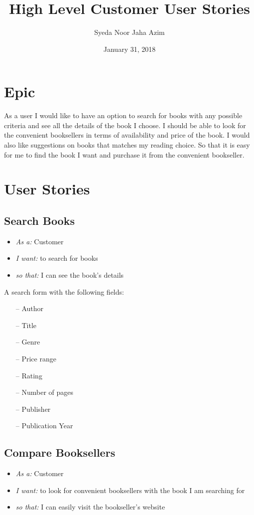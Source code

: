\documentclass{article}
\title{High Level Customer User Stories}
\author{Syeda Noor Jaha Azim}
\date{January 31, 2018}
\begin{document}
\maketitle

\section{Epic }
As a user I would like to have an option to search for books with any possible criteria and see all the details of the book I choose. I should be able to look for the convenient booksellers in terms of availability and price of the book. I would also like suggestions on books that matches my reading choice. So that it is easy for me to find the book I want and purchase it from the convenient bookseller. 

\section{User Stories }
\subsection{Search Books}
\begin{itemize}
\item \emph{As a:} Customer
\item \emph{I want:} to search for books
\item \emph{so that:}  I can see the book’s details
\end{itemize}


 A search form with the following fields:
\begin{itemize}
	\item[--] Author
	\item[--] Title
	\item[--] Genre
	\item[--] Price range
	\item[--] Rating
	\item[--] Number of pages
	\item[--] Publisher
	\item[--] Publication Year
\end{itemize}

\subsection{Compare Booksellers}
\begin{itemize}
\item \emph{As a:} Customer
\item \emph{I want:}  to look for convenient booksellers with the book I am searching for
\item \emph{so that:}  I can easily visit the bookseller’s website
\end{itemize}
\end{document}
